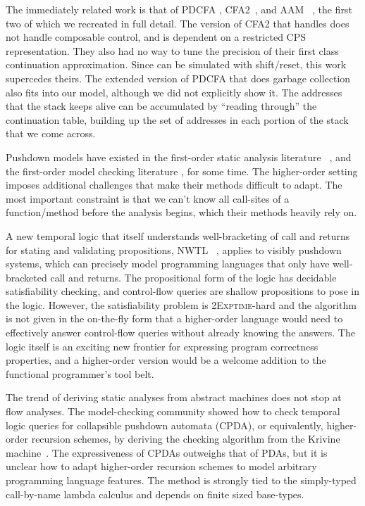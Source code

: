 \documentclass{llncs}
\newcommand{\Scribtexttt}[1]{{\texttt{#1}}}
\newcommand{\SColorize}[2]{\color{#1}{#2}}
\newcommand{\inColor}[2]{{\Scribtexttt{\SColorize{#1}{#2}}}}
\newcommand{\rackett}[1]{\inColor{black}{#1}}
\begin{document}
The immediately related work is that of PDCFA
\citep{ianjohnson:earl2010pdcfa},
CFA2~\citep{ianjohnson:vardoulakis-lmcs11,
  ianjohnson:Vardoulakis2011Pushdown}, and AAM
~\citep{dvanhorn:VanHorn2010Abstracting}, the first two of which we
recreated in full detail. The version of CFA2 that handles
\rackett{call/cc} does not handle composable control, and is dependent
on a restricted CPS representation. They also had no way to tune the
precision of their first class continuation approximation. Since
\rackett{call/cc} can be simulated with shift/reset, this work
supercedes theirs. The extended version of PDCFA that does garbage
collection \citep{dvanhorn:Earl2012Introspective} also fits into our
model, although we did not explicitly show it. The addresses that the
stack keeps alive can be accumulated by ``reading through'' the
continuation table, building up the set of addresses in each portion
of the stack that we come across.

Pushdown models have existed in the first-order static analysis
literature ~\citep[Chapter
7]{local:muchnick:jones:flow-analysis:1981}\citep{ianjohnson:reps:pushdown:1995},
and the first-order model checking literature
\citep{ianjohnson:bouajiani:esparza:pushdown:1997}, for some time. The
higher-order setting imposes additional challenges that make their
methods difficult to adapt. The most important constraint is that we
can't know all call-sites of a function/method before the analysis
begins, which their methods heavily rely on.

A new temporal logic that itself understands well-bracketing of call
and returns for stating and validating propositions, NWTL
~\citep{ianjohnson:alur:nwtl:2007}, applies to visibly pushdown
systems, which can precisely model programming languages that only have
well-bracketed call and returns. The propositional form of the logic
has decidable satisfiability checking, and control-flow queries are
shallow propositions to pose in the logic. However, the satisfiability
problem is \textsc{2Exptime}-hard and the algorithm is not given in
the on-the-fly form that a higher-order language would need to
effectively answer control-flow queries without already knowing the
answers. The logic itself is an exciting new frontier for expressing
program correctness properties, and a higher-order version would be a
welcome addition to the functional programmer's tool belt.

The trend of deriving static analyses from abstract machines does not
stop at flow analyses. The model-checking community showed how to
check temporal logic queries for collapsible pushdown automata (CPDA),
or equivalently, higher-order recursion schemes, by deriving the
checking algorithm from the Krivine
machine~\citep{ianjohnson:Salvati:2011:KMH:2027223.2027239}. The
expressiveness of CPDAs outweighs that of PDAs, but it is unclear how
to adapt higher-order recursion schemes to model arbitrary programming
language features. The method is strongly tied to the simply-typed
call-by-name lambda calculus and depends on finite sized base-types.
\end{document}
